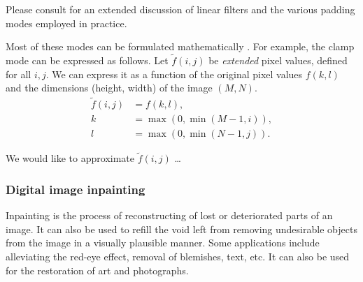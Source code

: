 \documentclass[12pt]{article} %
\theoremstyle{plain}
\theoremstyle{definition}
\theoremstyle{remark}
\begin{document}
Please consult \citet[p.~111-115]{Szeliski2011} for an extended discussion
of linear filters and the various padding modes employed in practice. 

Most of these modes can be formulated mathematically 
\cite[see][p.~114-115]{Szeliski2011}. For example, the clamp mode can be expressed 
as follows. Let $\tilde{f}(i, j)$ be \emph{extended} pixel values, defined for all 
$i, j$. We can express it as a function of the original pixel values $f(k, l)$ and the 
dimensions (height, width) of the image $(M, N)$.
\begin{align*}
  \tilde{f}(i, j) &= f(k, l), \\
  k               &= \max(0, \min(M-1, i)), \\
  l               &= \max(0, \min(N-1, j)).
\end{align*}

We would like to approximate $\tilde{f}(i, j)$ \dots


\subsubsection{Digital image inpainting}

Inpainting is the process of reconstructing of lost or deteriorated parts of an image. It 
can also be used to refill the void left from removing undesirable objects from the image
in a visually plausible manner. Some applications include alleviating the red-eye effect,
removal of blemishes, text, etc. It can also be used for the restoration
of art and photographs.
\end{document}
